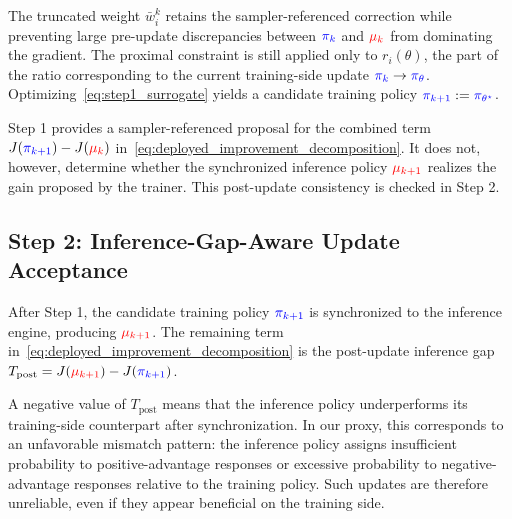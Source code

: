 The truncated weight $\bar{w}_i^k$ retains the sampler-referenced correction while preventing large pre-update discrepancies between $\textcolor{blue}{\pi_k}$ and $\textcolor{red}{\mu_k}$ from dominating the gradient. 
The proximal constraint is still applied only to $r_i(\theta)$, the part of the ratio corresponding to the current training-side update 
$\textcolor{blue}{\pi_k}\rightarrow\textcolor{blue}{\pi_\theta}$. 
Optimizing~\autoref{eq:step1_surrogate} yields a candidate training policy 
$\textcolor{blue}{\pi_{k+1}}:=\textcolor{blue}{\pi_{\theta^\star}}$.

Step 1 provides a sampler-referenced proposal for the combined term 
$J(\textcolor{blue}{\pi_{k+1}})-J(\textcolor{red}{\mu_k})$ 
in~\autoref{eq:deployed_improvement_decomposition}. 
It does not, however, determine whether the synchronized inference policy 
$\textcolor{red}{\mu_{k+1}}$ 
realizes the gain proposed by the trainer. 
This post-update consistency is checked in Step 2.

\subsection{Step 2: Inference-Gap-Aware Update Acceptance}
\label{sec:step2_inference_gap_acceptance}

After Step 1, the candidate training policy 
$\textcolor{blue}{\pi_{k+1}}$ 
is synchronized to the inference engine, producing 
$\textcolor{red}{\mu_{k+1}}$. 
The remaining term in~\autoref{eq:deployed_improvement_decomposition} is the post-update inference gap $T_{\mathrm{post}} = J(\textcolor{red}{\mu_{k+1}}) - J(\textcolor{blue}{\pi_{k+1}})$.

A negative value of $T_{\mathrm{post}}$ means that the inference policy underperforms its training-side counterpart after synchronization. 
In our proxy, this corresponds to an unfavorable mismatch pattern: the inference policy assigns insufficient probability to positive-advantage responses or excessive probability to negative-advantage responses relative to the training policy. 
Such updates are therefore unreliable, even if they appear beneficial on the training side.

